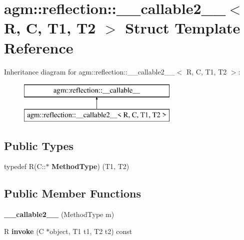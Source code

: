 \hypertarget{structagm_1_1reflection_1_1____callable2____}{}\section{agm\+:\+:reflection\+:\+:\+\_\+\+\_\+callable2\+\_\+\+\_\+$<$ R, C, T1, T2 $>$ Struct Template Reference}
\label{structagm_1_1reflection_1_1____callable2____}
Inheritance diagram for agm\+:\+:reflection\+:\+:\+\_\+\+\_\+callable2\+\_\+\+\_\+$<$ R, C, T1, T2 $>$\+:\begin{figure}[H]
\begin{center}
\leavevmode
\includegraphics[height=2.000000cm]{structagm_1_1reflection_1_1____callable2____}
\end{center}
\end{figure}
\subsection*{Public Types}
\begin{DoxyCompactItemize}
\item 
typedef R(C\+::$\ast$ {\bfseries Method\+Type}) (T1, T2)\hypertarget{structagm_1_1reflection_1_1____callable2_____a0689b4a19559c06d58057350316cbcf6}{}\label{structagm_1_1reflection_1_1____callable2_____a0689b4a19559c06d58057350316cbcf6}

\end{DoxyCompactItemize}
\subsection*{Public Member Functions}
\begin{DoxyCompactItemize}
\item 
{\bfseries \+\_\+\+\_\+callable2\+\_\+\+\_\+} (Method\+Type m)\hypertarget{structagm_1_1reflection_1_1____callable2_____a70b809694810955cab3e902bda082424}{}\label{structagm_1_1reflection_1_1____callable2_____a70b809694810955cab3e902bda082424}

\item 
R {\bfseries invoke} (C $\ast$object, T1 t1, T2 t2) const \hypertarget{structagm_1_1reflection_1_1____callable2_____a0fc2c100c3da2d629a200ff6f0738973}{}\label{structagm_1_1reflection_1_1____callable2_____a0fc2c100c3da2d629a200ff6f0738973}

\end{DoxyCompactItemize}
